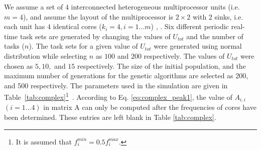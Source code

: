 \documentclass[conference]{IEEEtran}
\begin{document}
We assume a set of $4$ interconnected heterogeneous multiprocessor units (i.e. $m=4$), and 
assume the layout of the multiprocessor is $2\times 2$ with 2 sinks, i.e. each unit has $4$ identical cores ($k_i=4, i=1 \ldots m$)  \cite{Chantem10}, \cite{Fisher09}.
Six different periodic real-time task sets 
are generated
by changing the values of $U_{tot}$ and the  number of tasks ($n$).
The task sets for a given value of $U_{tot}$ were generated using normal distribution while selecting $n$ as $100$ and $200$ respectively.
The values of $U_{tot}$ were chosen as  $5, 10,$ and $15$ respectively. 
The size of the initial population, and the maximum number of generations for the genetic algorithms are selected as 200, and 500 respectively.
The parameters used in the simulation are given in Table~\ref{tab:complex}\footnote{It is assumed that $f_i^{min} = 0.5f_i^{max}$.}~\cite{Fisher09}. According to Eq. \ref{eq:complex_peak1}, the value of $A_{i,i}$ $(i=1\ldots4)$ in matrix A
can only be computed after the frequencies of cores have been determined. 
These entries are left blank in Table \ref{tab:complex}. 
\end{document}
